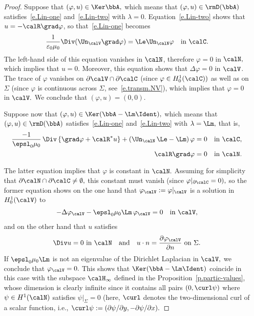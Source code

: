 \begin{proof}
Suppose that $(\varphi,u) \in \Ker \bbA,$ which means that $(\varphi,u) \in \rmD(\bbA)$ satisfies~\eqref{e.Lin-one} and~\eqref{e.Lin-two} with $\lambda=0$. Equation~\eqref{e.Lin-two} shows that $u = - \calR \grad \varphi$, so that~\eqref{e.Lin-one} becomes
\[
\frac{1}{\varepsilon_0 \mu_0} \Div (\Un_\calV \grad \varphi) = \Le \Un_\calN \varphi
\quad\text{in }\calC.
\]
The left-hand side of this equation vanishes in $\calN$, therefore $\varphi=0$ in $\calN,$ which implies that $u=0.$ Moreover, this equation shows that $\Delta \varphi=0$ in $\calV$. The trace of $\varphi$ vanishes on $\partial \calV \cap \partial \calC$ (since $\varphi \in H_0^1(\calC))$ as well as on $\Sigma$ (since $\varphi$ is continuous across $\Sigma$, see~\eqref{e.transm.NV}), which implies that $\varphi=0$ in $\calV.$ We conclude that $(\varphi,u)=(0,0)$.

Suppose now that $(\varphi,u) \in \Ker(\bbA - \Lm\Ident),$ which means that $(\varphi,u) \in \rmD(\bbA)$ satisfies~\eqref{e.Lin-one} and~\eqref{e.Lin-two} with $\lambda=\Lm,$ that is,
\begin{align*}
\frac{-1}{\epsl_0 \mu_0}\,\Div \left\{ \grad\varphi + \calR^* u \right\} + (\Un_\calN\,\Le - \Lm)\,\varphi &= 0 \quad\text{in }\calC, \\
\calR\grad\varphi &= 0 \quad\text{in }\calN.
\end{align*}
\goodbreak

\begingroup
The latter equation implies that $\varphi$ is constant in $\calN.$ Assuming for simplicity that $\partial\calN \cap \partial\calC \neq \emptyset,$ this constant must vanish (since $\varphi|_{\partial\calC} = 0),$ so the former equation shows on the one hand that $\varphi_\calV := \varphi|_\calV$ is a solution in $H^1_0(\calV)$ to
\[
-\Delta \varphi_\calV - \epsl_0 \mu_0 \Lm\,\varphi_\calV = 0 \quad\text{in }\calV,
\]
and on the other hand that $u$ satisfies
\[
\Div u = 0 \text{ in }\calN
\quad\text{and}\quad u \cdot n = \frac{\partial\varphi_\calV}{\partial n}\text{ on }\Sigma.
\]
\endgroup
If $\epsl_0 \mu_0 \Lm$ is not an eigenvalue of the Dirichlet Laplacian in $\calV,$ we conclude that $\varphi_\calV = 0.$ This shows that $\Ker(\bbA - \Lm\Ident)$ coincide in this case with the subspace $\calH_\infty$ defined in the Proposition~\ref{p.partic-values}, whose dimension is clearly infinite since it contains all pairs $(0,\curl\psi)$ where $\psi \in H^1(\calN)$ satisfies $\psi|_\Sigma =0$ (here, $\curl$ denotes the two-dimensional curl of a scalar function, i.e., $\curl\psi := (\partial\psi/\partial y, -\partial\psi/\partial x).$


\end{proof}
